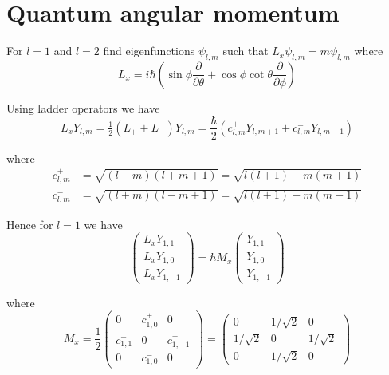 

\section*{Quantum angular momentum}

For $l=1$ and $l=2$
find eigenfunctions $\psi_{l,m}$ such that $L_x\psi_{l,m}=m\psi_{l,m}$ where
\begin{equation*}
L_x=i\hbar\left(
\sin\phi\frac{\partial}{\partial\theta}+\cos\phi\cot\theta\frac{\partial}{\partial\phi}
\right)
\end{equation*}

Using ladder operators we have
\begin{equation*}
L_xY_{l,m}=\tfrac{1}{2}(L_++L_-)Y_{l,m}
=\frac{\hbar}{2}\left(c_{l,m}^+Y_{l,m+1}+c_{l,m}^-Y_{l,m-1}\right)
\end{equation*}

where
\begin{align*}
c_{l,m}^+&=\sqrt{(l-m)(l+m+1)}=\sqrt{l(l+1)-m(m+1)}
\\
c_{l,m}^-&=\sqrt{(l+m)(l-m+1)}=\sqrt{l(l+1)-m(m-1)}
\end{align*}

Hence for $l=1$ we have
\begin{equation*}
\begin{pmatrix}L_xY_{1,1}\\L_xY_{1,0}\\L_xY_{1,-1}\end{pmatrix}
=
\hbar M_x\begin{pmatrix}Y_{1,1}\\Y_{1,0}\\Y_{1,-1}\end{pmatrix}
\end{equation*}

where
\begin{equation*}
M_x=\frac{1}{2}\begin{pmatrix}
0 & c_{1,0}^+ & 0
\\[1ex]
c_{1,1}^- & 0 & c_{1,-1}^+
\\[1ex]
0 & c_{1,0}^- & 0
\end{pmatrix}
=
\begin{pmatrix}
0 & 1/\sqrt2 & 0
\\[1ex]
1/\sqrt2 & 0 & 1/\sqrt2
\\[1ex]
0 & 1/\sqrt2 & 0
\end{pmatrix}
\end{equation*}

